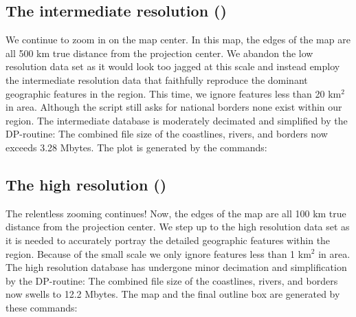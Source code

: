 


\subsection{The intermediate resolution ()} 

We continue to zoom in on the map center.  In this map, the
edges of the map are all 500 km true distance from the projection
center.  We abandon the low resolution data set as it would look
too jagged at this scale and instead employ the intermediate
resolution data that faithfully reproduce the dominant geographic
features in the region.  This time, we ignore features less than
20 km$^2$ in area.  Although the script still asks for national
borders none exist within our region.  The intermediate database
is moderately decimated and simplified by the DP-routine: The
combined file size of the coastlines, rivers, and borders now
exceeds 3.28 Mbytes.  The plot is generated by the commands:




\subsection{The high resolution ()} 

The relentless zooming continues!  Now, the edges of the map
are all 100 km true distance from the projection center.  We
step up to the high resolution data set as it is needed to
accurately portray the detailed geographic features within the
region.  Because of the small scale we only ignore features less
than 1 km$^2$ in area.  The high resolution database has undergone
minor decimation and simplification by the DP-routine: The
combined file size of the coastlines, rivers, and borders now
swells to 12.2 Mbytes.  The map and the final outline box are
generated by these commands:



